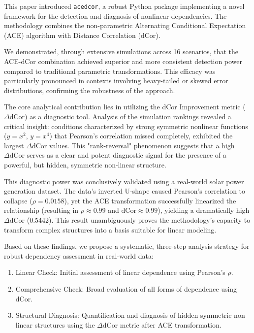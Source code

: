 \documentclass[a4paper,fleqn]{cas-sc}
\newcommand{\dCor}{\mathrm{dCor}}
\begin{document}
This paper introduced \texttt{acedcor}, a robust Python package implementing a novel framework for the detection and diagnosis of nonlinear dependencies. The methodology combines the non-parametric Alternating Conditional Expectation (ACE) algorithm with Distance Correlation ($\dCor$).

We demonstrated, through extensive simulations across 16 scenarios, that the ACE-$\dCor$ combination achieved superior and more consistent detection power compared to traditional parametric transformations. This efficacy was particularly pronounced in contexts involving heavy-tailed or skewed error distributions, confirming the robustness of the approach.

The core analytical contribution lies in utilizing the dCor Improvement metric ($\Delta\dCor$) as a diagnostic tool. Analysis of the simulation rankings revealed a critical insight: conditions characterized by strong symmetric nonlinear functions ($y=x^2$, $y=x^4$) that Pearson's correlation missed completely, exhibited the largest $\Delta\dCor$ values. This "rank-reversal" phenomenon suggests that a high $\Delta\dCor$ serves as a clear and potent diagnostic signal for the presence of a powerful, but hidden, symmetric non-linear structure.

This diagnostic power was conclusively validated using a real-world solar power generation dataset. The data's inverted U-shape caused Pearson's correlation to collapse ($\rho=0.0158$), yet the ACE transformation successfully linearized the relationship (resulting in $\rho \approx 0.99$ and $\dCor \approx 0.99$), yielding a dramatically high $\Delta\dCor$ (0.5442). This result unambiguously proves the methodology's capacity to transform complex structures into a basis suitable for linear modeling.

Based on these findings, we propose a systematic, three-step analysis strategy for robust dependency assessment in real-world data:
\begin{enumerate}
    \item Linear Check: Initial assessment of linear dependence using Pearson's $\rho$.
    \item Comprehensive Check: Broad evaluation of all forms of dependence using $\dCor$.
    \item Structural Diagnosis: Quantification and diagnosis of hidden symmetric non-linear structures using the $\Delta\dCor$ metric after ACE transformation.
\end{enumerate}
\end{document}
